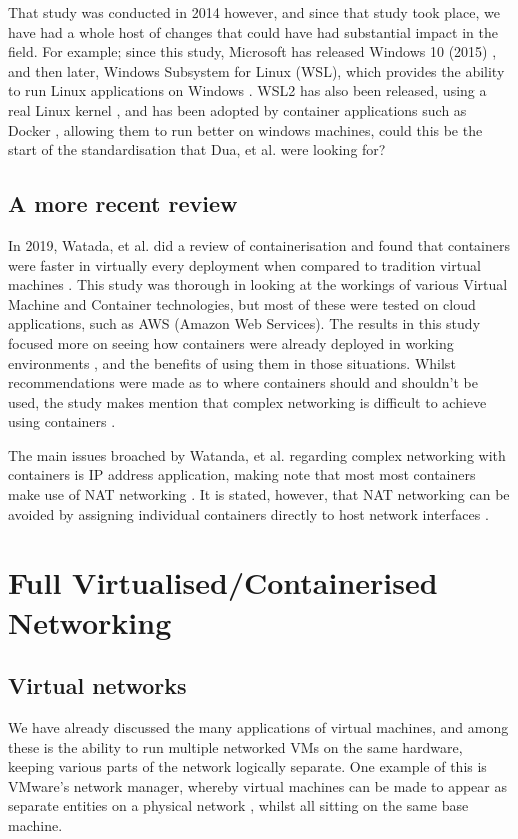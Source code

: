 That study was conducted in 2014 however, and since that study took place, we have had a whole host of changes that could have had substantial impact in the field. For example; since this study, Microsoft has released Windows 10 (2015) \citep{WindowsIntro}, and then later, Windows Subsystem for Linux (WSL), which provides the ability to run Linux applications on Windows \citep{wslrelease}. WSL2 has also been released, using a real Linux kernel \citep{wslkernel}, and has been adopted by container applications such as Docker \citep{Dockerwsl}, allowing them to run better on windows machines, could this be the start of the standardisation that Dua, et al. were looking for?

\subsection{A more recent review}
In 2019, Watada, et al. did a review of containerisation and found that containers were faster in virtually every deployment when compared to tradition virtual machines \citep{watanda19}. This study was thorough in looking at the workings of various Virtual Machine and Container technologies, but most of these were tested on cloud applications, such as AWS (Amazon Web Services). The results in this study focused more on seeing how containers were already deployed in working environments \citep[VII.]{watanda19}, and the benefits of using them in those situations. Whilst recommendations were made as to where containers should and shouldn't be used, the study makes mention that complex networking is difficult to achieve using containers \citep[VIII. A.]{watanda19}.

The main issues broached by Watanda, et al. regarding complex networking with containers is IP address application, making note that most most containers make use of NAT networking \citep[VIII. A.]{watanda19}. It is stated, however, that NAT networking can be avoided by assigning individual containers directly to host network interfaces \citep[VIII. A.]{watanda19}.

\section{Full Virtualised/Containerised Networking}
\subsection{Virtual networks}
We have already discussed the many applications of virtual machines, and among these is the ability to run multiple networked VMs on the same hardware, keeping various parts of the network logically separate. One example of this is VMware's network manager, whereby virtual machines can be made to appear as separate entities on a physical network \citep{VMwareNetChange}, whilst all sitting on the same base machine.

